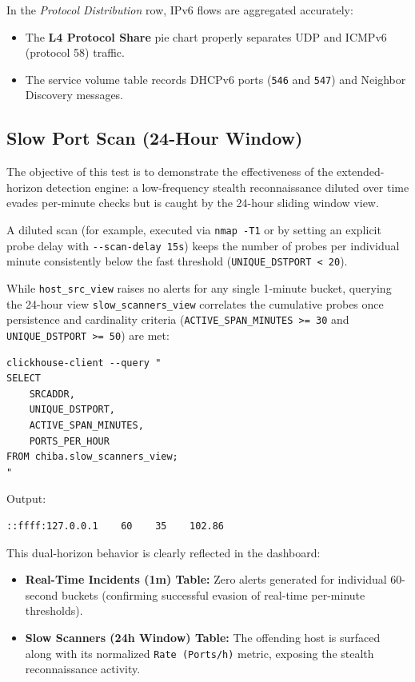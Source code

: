 \documentclass[11pt,a4paper]{article}
\newenvironment{codebox}[1][]{%
    \begin{tcolorbox}[
        colback=codebg,
        colframe=codeframe,
        boxrule=0.6pt,
        arc=1.5mm,
        left=3mm,
        right=3mm,
        top=2mm,
        bottom=2mm,
        fonttitle=\sffamily\bfseries\footnotesize,
        coltitle=chibadark,
        colbacktitle=codeframe!50!white,
        #1
    ]
}{%
    \end{tcolorbox}
}
\begin{document}
In the \emph{Protocol Distribution} row, IPv6 flows are aggregated accurately:
\begin{itemize}
    \item The \textbf{L4 Protocol Share} pie chart properly separates UDP and ICMPv6 (protocol 58) traffic.
    \item The service volume table records DHCPv6 ports (\texttt{546} and \texttt{547}) and Neighbor Discovery messages.
\end{itemize}

\subsection{Slow Port Scan (24-Hour Window)}
The objective of this test is to demonstrate the effectiveness of the extended-horizon detection engine: a low-frequency stealth reconnaissance diluted over time evades per-minute checks but is caught by the 24-hour sliding window view.

A diluted scan (for example, executed via \texttt{nmap -T1} or by setting an explicit probe delay with \texttt{-{}-scan-delay 15s}) keeps the number of probes per individual minute consistently below the fast threshold (\texttt{UNIQUE\_DSTPORT < 20}).

While \texttt{host\_src\_view} raises no alerts for any single 1-minute bucket, querying the 24-hour view \texttt{slow\_scanners\_view} correlates the cumulative probes once persistence and cardinality criteria (\texttt{ACTIVE\_SPAN\_MINUTES >= 30} and \texttt{UNIQUE\_DSTPORT >= 50}) are met:
\begin{codebox}[title={ClickHouse 24-Hour Slow Scanner Verification Query}]
\footnotesize
\begin{verbatim}
clickhouse-client --query "
SELECT
    SRCADDR,
    UNIQUE_DSTPORT,
    ACTIVE_SPAN_MINUTES,
    PORTS_PER_HOUR
FROM chiba.slow_scanners_view;
"
\end{verbatim}
\end{codebox}

Output:
\begin{codebox}
\footnotesize
\begin{verbatim}
::ffff:127.0.0.1    60    35    102.86
\end{verbatim}
\end{codebox}

This dual-horizon behavior is clearly reflected in the dashboard:
\begin{itemize}
    \item \textbf{Real-Time Incidents (1m) Table:} Zero alerts generated for individual 60-second buckets (confirming successful evasion of real-time per-minute thresholds).
    \item \textbf{Slow Scanners (24h Window) Table:} The offending host is surfaced along with its normalized \texttt{Rate (Ports/h)} metric, exposing the stealth reconnaissance activity.
\end{itemize}
\end{document}
